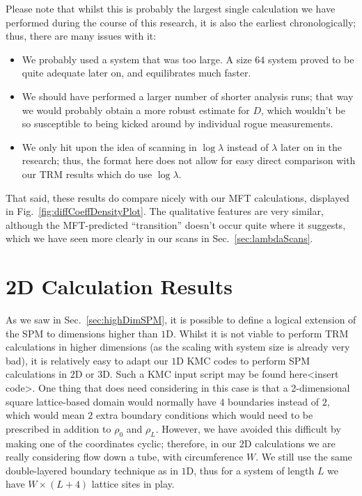 Please note that whilst this is probably the largest single calculation we have performed during the 
course of this research, it is also the earliest chronologically; thus, there are many issues
with it:
\begin{itemize}
 \item We probably used a system that was too large. A size $64$ system proved to be quite adequate
 later on, and equilibrates much faster.
 \item We should have performed a larger number of shorter analysis runs; that way we would
 probably obtain a more robust estimate for $D$, which wouldn't be so susceptible to being
 kicked around by individual rogue measurements.
 \item We only hit upon the idea of scanning in $\log \lambda$ instead of $\lambda$ later on
 in the research; thus, the format here does not allow for easy direct comparison with our TRM
 results which do use $\log \lambda$. 
\end{itemize}
That said, these results do compare nicely with our MFT calculations, displayed in 
Fig.~\ref{fig:diffCoeffDensityPlot}. The qualitative features are very similar, although the
MFT-predicted ``transition'' doesn't occur quite where it suggests, which we have seen  
more clearly in our scans in Sec.~\ref{sec:lambdaScans}.

\section{2D Calculation Results}
As we saw in Sec.~\ref{sec:highDimSPM}, it is possible to define a logical extension of the SPM
to dimensions higher than $1$D. Whilst it is not viable to perform TRM calculations in higher 
dimensions (as the scaling with system size is already very bad), it is relatively easy to adapt
our $1$D KMC codes to perform SPM calculations in $2$D or $3$D. Such a KMC input script may be found
here<insert code>. One thing that does need considering in this case is that a 2-dimensional square
lattice-based domain would normally have $4$ boundaries instead of $2$, which would mean $2$ extra
boundary conditions which would need to be prescribed in addition to $\rho_0$ and $\rho_L$.
However, we have avoided this difficult by making one of the coordinates cyclic; therefore, in our
$2$D calculations we are really considering flow down a tube, with circumference $W$. We still
use the same double-layered boundary technique as in $1$D, thus for a system of length $L$
we have $W \times (L+4)$ lattice sites in play.

